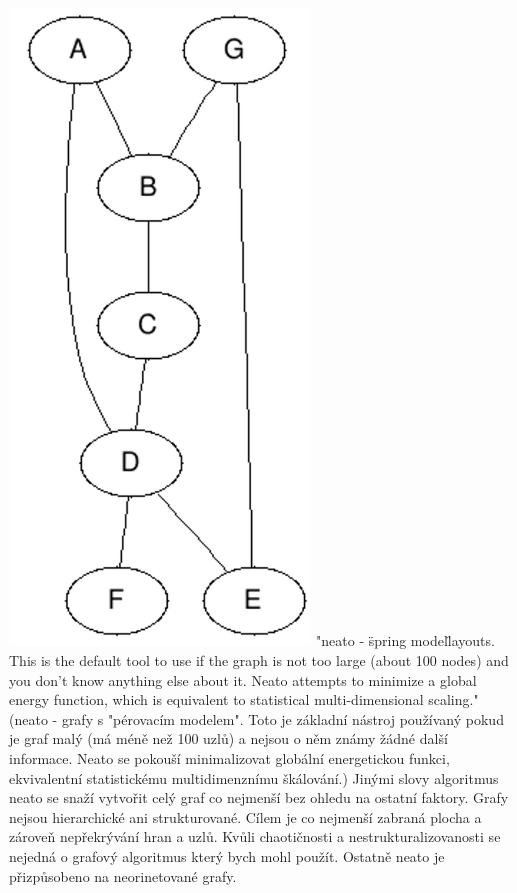 \documentclass[color,table,oneside,nolot,nolof]{fithesis}
\begin{document}
	\includegraphics[width=0.6\textwidth]{pictures/dot_example.png} 
	"neato - \"spring model\" layouts.  This is the default tool to use if the graph is not too large (about 100 nodes) and you don't know anything else about it. Neato attempts to
	minimize a global energy function, which is equivalent to statistical multi-dimensional scaling."\cite{graphviz_layout}(neato - grafy s "pérovacím modelem". Toto je základní nástroj
	používaný pokud je graf malý (má méně než 100 uzlů) a nejsou o něm známy žádné další informace. Neato se pokouší minimalizovat globální energetickou funkci, ekvivalentní
	statistickému multidimenznímu škálování.) Jinými slovy algoritmus neato se snaží vytvořit celý graf co nejmenší bez ohledu na ostatní faktory. Grafy nejsou hierarchické ani 
	strukturované. Cílem je co nejmenší zabraná plocha a zároveň nepřekrývání hran a uzlů. Kvůli chaotičnosti a nestrukturalizovanosti se nejedná o grafový algoritmus který bych mohl
	použít. Ostatně neato je přizpůsobeno na neorinetované grafy.
\end{document}
